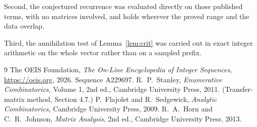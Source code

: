 \documentclass[11pt,a4paper]{article}
\theoremstyle{plain}
\theoremstyle{definition}
\begin{document}
Second, the conjectured recurrence was evaluated directly on those published terms, with no
matrices involved, and holds wherever the proved range and the data overlap.

Third, the annihilation test of Lemma~\ref{lem:crit} was carried out in exact integer
arithmetic on the whole vector rather than on a sampled prefix.

\begin{thebibliography}{9}
 The OEIS Foundation, \emph{The On-Line Encyclopedia of Integer
Sequences}, \url{https://oeis.org}, 2026. Sequence A229697.
 R.~P.~Stanley, \emph{Enumerative Combinatorics}, Volume 1, 2nd ed.,
Cambridge University Press, 2011. (Transfer-matrix method, Section 4.7.)
 P.~Flajolet and R.~Sedgewick, \emph{Analytic Combinatorics}, Cambridge
University Press, 2009.
 R.~A.~Horn and C.~R.~Johnson, \emph{Matrix Analysis}, 2nd ed., Cambridge
University Press, 2013.
\end{thebibliography}
\end{document}
